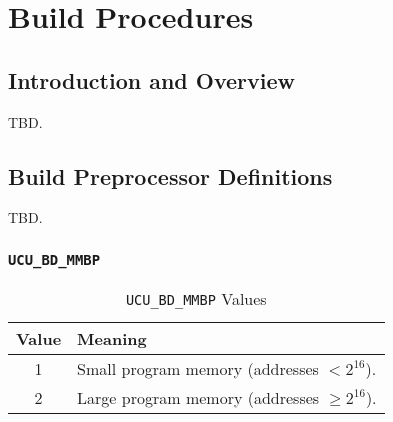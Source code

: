 
\chapter{\emph{\productbasenameshort{}} Build Procedures}        
\label{cbpc0}

\section{Introduction and Overview}
\label{cbpc0:siov0}

TBD.


\section{Build Preprocessor Definitions}
\label{cbpc0:sbpd0}

TBD.


\subsection{\texttt{UCU\_BD\_MMBP}}
\label{cbpc0:sbpd0:smmp0}

\begin{table}
\caption{\texttt{UCU\_BD\_MMBP} Values}
\label{tbl:cbpc0:sbpd0:smmp0:01}
\begin{center}
\begin{tabular}{|c|l|}
\hline
Value         & Meaning                                                          \\
\hline
\hline
1             & Small program memory (addresses $<2^{16}$).                      \\
\hline
2             & Large program memory (addresses $\geq 2^{16}$).                  \\
\hline
\end{tabular}
\end{center}
\end{table}

